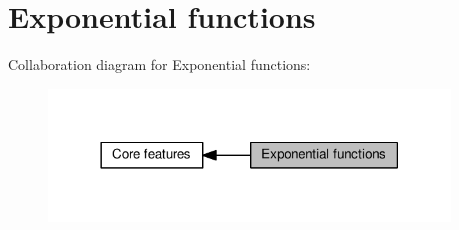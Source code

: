 \hypertarget{group__core__func__exponential}{}\section{Exponential functions}
\label{group__core__func__exponential}
Collaboration diagram for Exponential functions\+:
\nopagebreak
\begin{figure}[H]
\begin{center}
\leavevmode
\includegraphics[width=302pt]{df/d74/group__core__func__exponential}
\end{center}
\end{figure}

